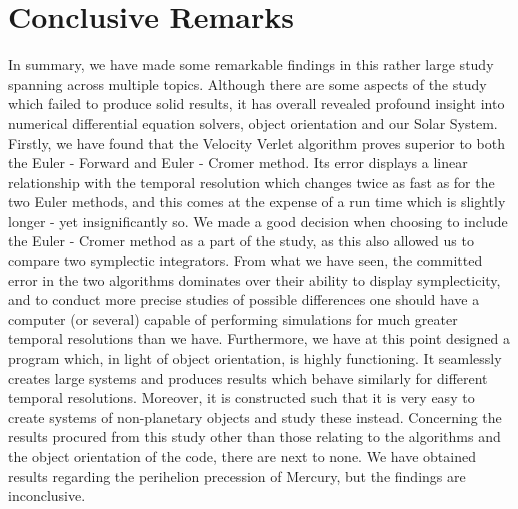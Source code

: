 \section{Conclusive Remarks}
In summary, we have made some remarkable findings in this rather large study spanning across multiple topics. Although there are some aspects of the study which failed to produce solid results, it has overall revealed profound insight into numerical differential equation solvers, object orientation and our Solar System. Firstly, we have found that the Velocity Verlet algorithm proves superior to both the Euler - Forward and Euler - Cromer method. Its error displays a linear relationship with the temporal resolution which changes twice as fast as for the two Euler methods, and this comes at the expense of a run time which is slightly longer - yet insignificantly so. We made a good decision when choosing to include the Euler - Cromer method as a part of the study, as this also allowed us to compare two symplectic integrators. From what we have seen, the committed error in the two algorithms dominates over their ability to display symplecticity, and to conduct more precise studies of possible differences one should have a computer (or several) capable of performing simulations for much greater temporal resolutions than we have. Furthermore, we have at this point designed a program which, in light of object orientation, is highly functioning. It seamlessly creates large systems and produces results which behave similarly for different temporal resolutions. Moreover, it is constructed such that it is very easy to create systems of non-planetary objects and study these instead. Concerning the results procured from this study other than those relating to the algorithms and the object orientation of the code, there are next to none. We have obtained results regarding the perihelion precession of Mercury, but the findings are inconclusive.